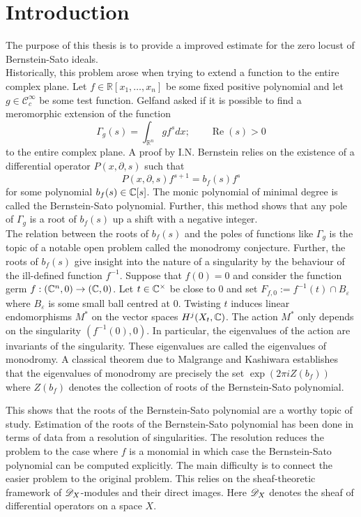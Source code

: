 \chapter*{Introduction}\label{ch: Introduction} %



The purpose of this thesis is to provide a improved estimate for the zero locust of Bernstein-Sato ideals.\\

Historically, this problem arose when trying to extend a function to the entire complex plane.
Let $f\in \mathbb{R}[x_1,\ldots,x_n]$ be some fixed positive polynomial and let $g \in \mathcal{C}_c^\infty$ be some test function.
Gelfand asked if it is possible to find a meromorphic extension of the function
$$\Gamma_g(s) = \int_{\mathbb{R}^n} g f^s dx; \qquad \operatorname{Re}(s)>0 $$
to the entire complex plane.
A proof by I.N. Bernstein relies on the existence of a differential operator $P(x,\partial, s)$ such that
$$P(x,\partial,s) f^{s+1} = b_f(s) f^s$$
for some polynomial $b_f(s)\in \mathbb{C}[s]$.
The monic polynomial of minimal degree is called the Bernstein-Sato polynomial.
Further, this method shows that any pole of $\Gamma_g$ is a root of $b_f(s)$ up a shift with a negative integer.\\

The relation between the roots of $b_f(s)$ and the poles of functions like $\Gamma_g$ is the topic of a notable open problem called the monodromy conjecture.
Further, the roots of $b_f(s)$ give insight into the nature of a singularity by the behaviour of the ill-defined function $f^{-1}$.
Suppose that $f(0)= 0$ and consider the function germ $f:(\mathbb{C}^n,0)\to (\mathbb{C},0)$.
Let $t\in \mathbb{C}^\times$ be close to $0$ and set $F_{f,0} := f^{-1}(t)\cap B_\varepsilon$ where $B_\varepsilon$ is some small ball centred at $0$.
Twisting $t$ induces linear endomorphisms $M^*$ on the vector spaces $H^j(X_t,\mathbb{C})$.
The action $M^*$ only depends on the singularity $(f^{-1}(0),0)$.
In particular, the eigenvalues of the action are invariants of the singularity.
These eigenvalues are called the eigenvalues of monodromy.
A classical theorem due to Malgrange and Kashiwara establishes that the eigenvalues of monodromy are precisely the set $\exp(2\pi i Z(b_f))$ where $Z(b_f)$ denotes the collection of roots of the Bernstein-Sato polynomial.

This shows that the roots of the Bernstein-Sato polynomial are a worthy topic of study.
Estimation of the roots of the Bernstein-Sato polynomial has been done in terms of data from a resolution of singularities.
The resolution reduces the problem to the case where $f$ is a monomial in which case the Bernstein-Sato polynomial can be computed explicitly.
The main difficulty is to connect the easier problem to the original problem.
This relies on the sheaf-theoretic framework of $\mathscr{D}_X$-modules and their direct images.
Here $\mathscr{D}_X$ denotes the sheaf of differential operators on a space $X$.


